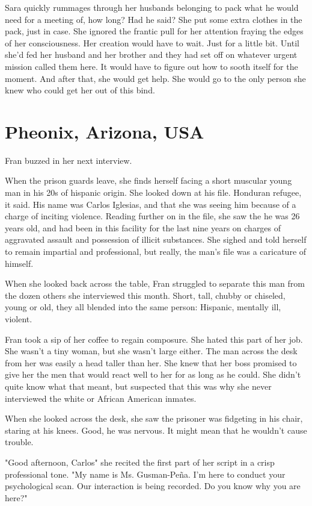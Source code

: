 \documentclass{article}
\begin{document}
Sara quickly rummages through her husbands belonging to pack what he would need for a meeting of, how long? Had he said? She put some extra clothes in the pack, just in case. She ignored the frantic pull for her attention fraying the edges of her consciousness. Her creation would have to wait. Just for a little bit. Until she'd fed her husband and her brother and they had set off on whatever urgent mission called them here. It would have to figure out how to sooth itself for the moment. And after that, she would get help. She would go to the only person she knew who could get her out of this bind.

\section{Pheonix, Arizona, USA}
Fran buzzed in her next interview. 

When the prison guards leave, she finds herself facing a short muscular young man in his 20s of hispanic origin. She looked down at his file. Honduran refugee, it said. His name was Carlos Iglesias, and that she was seeing him because of a charge of inciting violence. Reading further on in the file, she saw the he was 26 years old, and had been in this facility for the last nine years on charges of aggravated assault and possession of illicit substances. She sighed and told herself to remain impartial and professional, but really, the man's file was a caricature of himself. 

When she looked back across the table, Fran struggled to separate this man from the dozen others she interviewed this month.  Short, tall, chubby or chiseled, young or old, they all blended into the same person: Hispanic, mentally ill, violent.

Fran took a sip of her coffee to regain composure. She hated this part of her job. She wasn’t a tiny woman, but she wasn’t large either. The man across the desk from her was easily a head taller than her. She knew that her boss promised to give her the men that would react well to her for as long as he could. She didn’t quite know what that meant, but suspected that this was why she never interviewed the white or African American inmates. 

When she looked across the desk, she saw the prisoner was fidgeting in his chair, staring at his knees. Good, he was nervous. It might mean that he wouldn’t cause trouble.

"Good afternoon, Carlos" she recited the first part of her script in a crisp professional tone. "My name is Ms. Gusman-Pe\~{n}a. I'm here to conduct your psychological scan. Our interaction is being recorded. Do you know why you are here?" 
\end{document}
